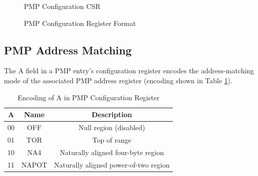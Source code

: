 \begin{figure}[htbp]
  \centering
  \def\stackalignment{r} %
  {\scriptsize }
  \caption{PMP Configuration CSR}
  \label{fig:pmpaddr}
\end{figure}

\begin{figure}[htbp]
  \centering
  \def\stackalignment{r} %
  {\scriptsize }
  \caption{PMP Configuration Register Format}
  \label{fig:pmpconf}
\end{figure}

\subsection{PMP Address Matching}
\label{subsec:pmpaddressmatching}

The A field in a PMP entry’s configuration register encodes the address-matching
mode of the associated PMP address register (encoding shown in Table \ref{tab:addressmatching}).

\begin{table}
  \centering
  \begin{tabular}{|c|c|c|}
    \hline
    \textbf{A} & \textbf{Name} & \textbf{Description}                  \\
    \hline
    00         & OFF           & Null region (disabled)                \\
    \hline
    01         & TOR           & Top of range                          \\
    \hline
    10         & NA4           & Naturally aligned four-byte region    \\
    \hline
    11         & NAPOT         & Naturally aligned power-of-two region \\
    \hline
  \end{tabular}
  \caption{Encoding of A in PMP Configuration Register}
  \label{tab:addressmatching}
\end{table}

